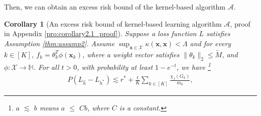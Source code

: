 \documentclass{article}
\def\vx{{\mathbf{x}}}
\def\eE{\mathbb{E}}
\newtheorem{corollary}{Corollary}
\begin{document}
Then, we can obtain an excess risk bound of the kernel-based algorithm $\mathcal{A}$.
\begin{corollary}[An excess risk bound of kernel-based learning algorithm $\mathcal{A}$, proof in Appendix \ref{pro:corollary2.1_proof}]\label{thm: loss bound computing}  
Suppose a loss function $L$ satisfies Assumption \ref{thm:assump2}.
Assume $\sup _{\vx \in \mathcal{X}} \kappa(\vx,\vx) < \Lambda$ and for every $k \in [K]$, $f_k = \theta_k^T \phi(\vx_k)$, where a weight vector satisfies $\|\theta_k\|_2 \leq \widetilde{M}$, and $\phi: \mathcal{X} \rightarrow \mathbb{H}$. 
For all $t > 0$, with probability at least $1 - e^{-t}$, we have \footnote{$a$ $\lesssim$ $b$ means $a$ $\leq$ $Cb$, where $C$ is a constant.}
\begin{align} 
    P (L_{\hat{h}} - L_{h^*}) \lesssim r^* + \frac{ t}{K} \sum_{k \in [K]} \frac{\chi_f(G_k)}{m_k},
\end{align}

\end{corollary}
\end{document}
